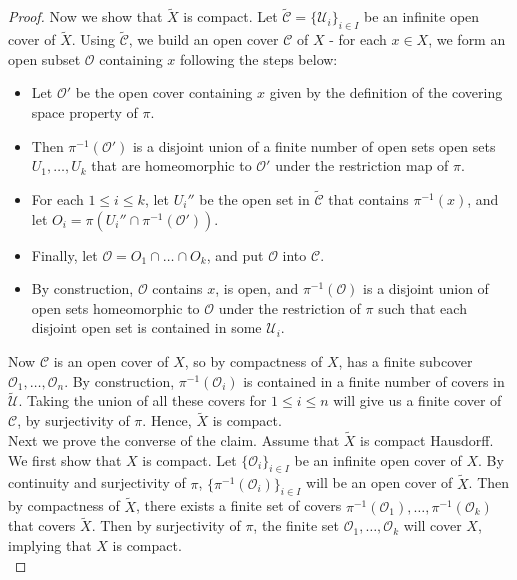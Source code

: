 \documentclass{article}
\begin{document}
\begin{enumerate}
\begin{proof}
      Now we show that $\tilde{X}$ is compact. Let
      $\tilde{\mathcal{C}}=\{\mathcal{U}_i\}_{i\in I}$ be an infinite open
      cover of $\tilde{X}$. Using $\tilde{\mathcal{C}}$, we build an open
      cover $\mathcal{C}$ of $X$ - for each $x\in X$, we form an open
      subset $\mathcal{O}$ containing $x$ following the steps below:
      \begin{itemize}
        \item Let $\mathcal{O}'$ be the open cover containing $x$ given by
          the definition of the covering space property of $\pi$.
        \item Then $\pi^{-1}(\mathcal{O}')$ is a disjoint union of a finite
          number of open sets open sets $U_1,\ldots,U_k$ that are
          homeomorphic to $\mathcal{O}'$ under the restriction map of
          $\pi$.
        \item For each $1\leq i\leq k$, let $U_i''$ be the open set in
          $\tilde{\mathcal{C}}$ that contains $\pi^{-1}(x)$, and let
          $O_i=\pi(U_i''\cap\pi^{-1}(\mathcal{O}'))$.
        \item Finally, let $\mathcal{O}=O_1\cap\ldots\cap O_k$, and put
          $\mathcal{O}$ into $\mathcal{C}$.
        \item By construction, $\mathcal{O}$ contains $x$, is open, and
          $\pi^{-1}(\mathcal{O})$ is a disjoint union of open sets
          homeomorphic to $\mathcal{O}$ under the restriction of $\pi$ such
          that each disjoint open set is contained in some $\mathcal{U}_i$.
      \end{itemize}
      Now $\mathcal{C}$ is an open cover of $X$, so by compactness of $X$,
      has a finite subcover $\mathcal{O}_1,\ldots,\mathcal{O}_n$. By
      construction, $\pi^{-1}(\mathcal{O}_i)$ is contained in a finite
      number of covers in $\tilde{\mathcal{U}}$. Taking the union of all
      these covers for $1\leq i\leq n$ will give us a finite cover of
      $\mathcal{C}$, by surjectivity of $\pi$. Hence, $\tilde{X}$ is
      compact. \\

      Next we prove the converse of the claim. Assume that $\tilde{X}$ is
      compact Hausdorff. We first show that $X$ is compact. Let
      $\{\mathcal{O}_i\}_{i\in I}$ be an infinite open cover of $X$. By
      continuity and surjectivity of $\pi$,
      $\{\pi^{-1}(\mathcal{O}_i)\}_{i\in I}$ will be an open cover of
      $\tilde{X}$. Then by compactness of $\tilde{X}$, there exists a
      finite set of covers
      $\pi^{-1}(\mathcal{O}_1),\ldots,\pi^{-1}(\mathcal{O}_k)$ that covers
      $\tilde{X}$. Then by surjectivity of $\pi$, the finite set
      $\mathcal{O}_1,\ldots,\mathcal{O}_k$ will cover $X$, implying that
      $X$ is compact. \\


\end{proof}
\end{enumerate}
\end{document}
